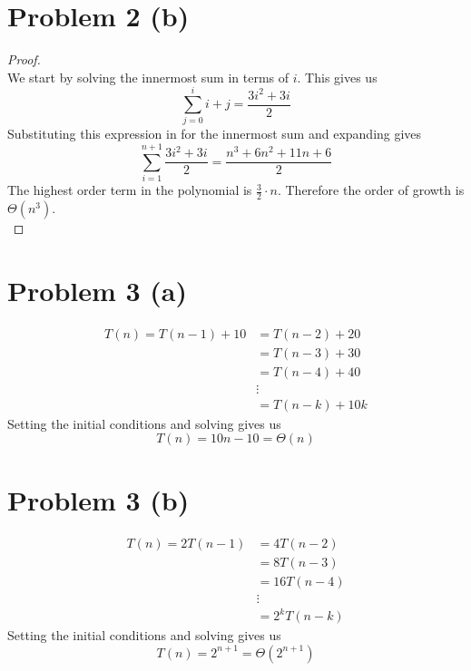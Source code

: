 \documentclass{article}
\newenvironment{problem}[1]{
  \nobreak\section*{Problem #1}
}{}
\newcommand*{\bigTheta}[1]{\ensuremath{\Theta\left(#1\right)}}
\begin{document}
  \begin{problem}{2 (b)}
    \begin{proof}
      $ $\\
      We start by solving the innermost sum in terms of $i$.  This gives us
      \begin{displaymath}
        \sum_{j = 0}^{i} i + j = \frac{3i^2+3i}{2}
      \end{displaymath}
      Substituting this expression in for the innermost sum and expanding gives
      \begin{displaymath}
        \sum_{i = 1}^{n + 1} \frac{3i^2+3i}{2} = \frac{n^3 + 6n^2 + 11n + 6}{2}
      \end{displaymath}
      The highest order term in the polynomial is $\frac{3}{2} \cdot n$.  Therefore
      the order of growth is $\bigTheta{n^3}$.
      $ $\\
    \end{proof}
  \end{problem}

  \begin{problem}{3 (a)}
    \begin{equation*}
      \begin{split}
        T(n) = T(n - 1) + 10 & = T(n - 2) + 20 \\
        & = T(n - 3) + 30 \\
        & = T(n - 4) + 40 \\
        & \vdots \\
        & = T(n - k) + 10k
      \end{split}
    \end{equation*}
    Setting the initial conditions and solving gives us
    \begin{displaymath}
      T(n) = 10n - 10 = \bigTheta{n}
    \end{displaymath}
  \end{problem}

  \begin{problem}{3 (b)}
    \begin{equation*}
      \begin{split}
        T(n) = 2T(n - 1) & = 4T(n - 2) \\
        & = 8T(n - 3) \\
        & = 16T(n - 4) \\
        & \vdots \\
        & = 2^kT(n - k)
      \end{split}
    \end{equation*}
    Setting the initial conditions and solving gives us
    \begin{displaymath}
      T(n) = 2^{n + 1} = \bigTheta{2^{n + 1}}
    \end{displaymath}
  \end{problem}
\end{document}
